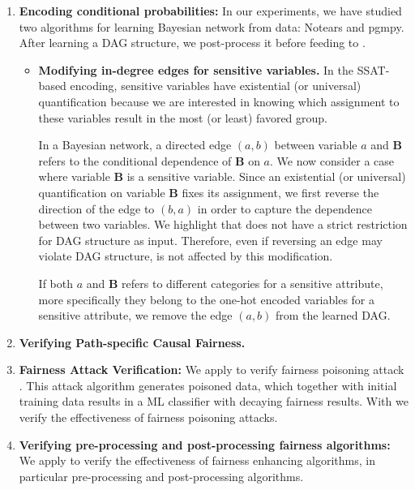 \begin{enumerate}
	\item \textbf{Encoding conditional probabilities:} In our experiments, we have studied two algorithms for learning Bayesian network from data: Notears and pgmpy. After learning a DAG structure, we post-process it before feeding to {\framework}. 
	
	\begin{itemize}
		\item \textbf{Modifying in-degree edges for sensitive variables.} In the SSAT-based encoding, sensitive variables have existential (or universal) quantification because we are interested in knowing which assignment to these variables result in the most (or least) favored group. 
		
		In a Bayesian network, a directed edge $ (a,b) $ between variable $ a $ and $\mathbf{B}$ refers to the conditional dependence of $\mathbf{B}$ on $ a $.  We now consider a case where variable $\mathbf{B}$ is a sensitive variable. Since an existential (or universal) quantification on variable $\mathbf{B}$ fixes its assignment, we first reverse the direction of the edge to $ (b,a) $ in order to capture the dependence between two variables. We highlight that {\framework} does not have a strict restriction for DAG structure as input. Therefore, even if reversing an edge may violate DAG structure, {\framework} is not affected by this modification. 
		
		If both $ a $ and $\mathbf{B}$ refers to different categories for a sensitive attribute, more specifically they belong to the one-hot encoded variables for a sensitive attribute, we remove the edge $ (a, b) $ from the learned DAG.  
		
		
		
		
	\end{itemize}
	
	\item \textbf{Verifying Path-specific Causal Fairness.}
	
	\item \textbf{Fairness Attack Verification:} We apply {\framework} to verify fairness poisoning attack \cite{?}. This attack algorithm generates poisoned data, which together with initial training data results in a ML classifier with decaying fairness results. With {\framework} we verify the effectiveness of fairness poisoning attacks.
	
	\item \textbf{Verifying pre-processing and post-processing fairness algorithms:} We apply {\framework} to verify the  effectiveness of fairness enhancing algorithms, in particular pre-processing and post-processing algorithms. 
	

\end{enumerate}

